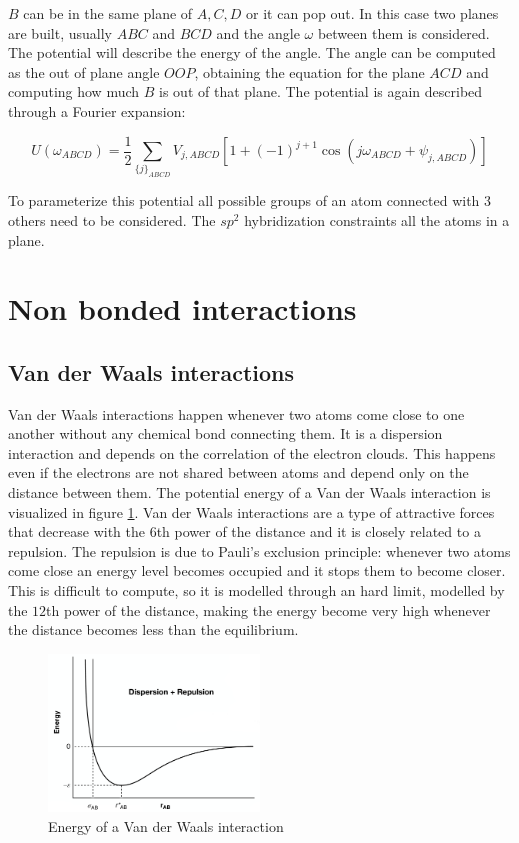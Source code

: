		$B$ can be in the same plane of $A, C, D$ or it can pop out.
		In this case two planes are built, usually $ABC$ and $BCD$ and the angle $\omega$ between them is considered.
		The potential will describe the energy of the angle.
		The angle can be computed as the out of plane angle $OOP$, obtaining the equation for the plane $ACD$ and computing how much $B$ is out of that plane.
		The potential is again described through a Fourier expansion:

		$$U(\omega_{ABCD}) = \frac{1}{2}\sum\limits_{\{j\}_{ABCD}}V_{j,ABCD}[1+(-1)^{j+1}\cos(j\omega_{ABCD}+\psi_{j,ABCD})]$$

		To parameterize this potential all possible groups of an atom connected with $3$ others need to be considered.
		The $sp^2$ hybridization constraints all the atoms in a plane.

\section{Non bonded interactions}

	\subsection{Van der Waals interactions}
	Van der Waals interactions happen whenever two atoms come close to one another without any chemical bond connecting them.
	It is a dispersion interaction and depends on the correlation of the electron clouds.
	This happens even if the electrons are not shared between atoms and depend only on the distance between them.
	The potential energy of a Van der Waals interaction is visualized in figure \ref{fig:van-der-waals}.
	Van der Waals interactions are a type of attractive forces that decrease with the $6$th power of the distance and it is closely related to a repulsion.
	The repulsion is due to Pauli's exclusion principle: whenever two atoms come close an energy level becomes occupied and it stops them to become closer.
	This is difficult to compute, so it is modelled through an hard limit, modelled by the $12$th power of the distance, making the energy become very high whenever the distance becomes less than the equilibrium.

	\begin{figure}[H]
		\centering
		\includegraphics[width=0.5\textwidth]{van-der-waals}
		\caption{Energy of a Van der Waals interaction}
		\label{fig:van-der-waals}
	\end{figure}

